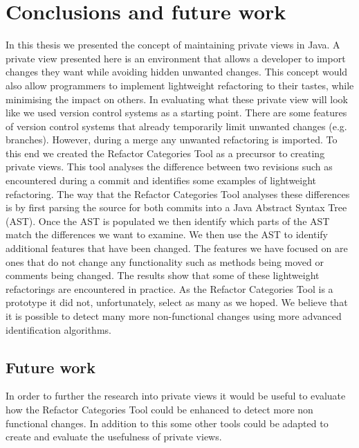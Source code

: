 
\chapter{Conclusions and future work}\label{C:con}

In this thesis we presented the concept of maintaining private views in Java.
A private view presented here is an environment that allows a developer to import changes they want while avoiding hidden unwanted changes. 
This concept would also allow programmers to implement lightweight refactoring to their tastes, while minimising the impact on others.  
In evaluating what these private view will look like we used version control systems as a starting point.
There are some features of version control systems that already temporarily limit unwanted changes (e.g. branches).
However, during a merge any unwanted refactoring is imported. 
To this end we created the Refactor Categories Tool as a precursor to creating private views. 
This tool analyses the difference between two revisions such as encountered during a commit and identifies some examples of lightweight refactoring.
The way that the Refactor Categories Tool analyses these differences is by first parsing the source for both commits into a Java Abstract Syntax Tree (AST).
Once the AST is populated we then identify which parts of the AST match the differences we want to examine.
We then use the AST to identify additional features that have been changed. 
The features we have focused on are ones that do not change any functionality such as methods being moved or comments being changed. 
The results show that some of these lightweight refactorings are encountered in practice.
As the Refactor Categories Tool is a prototype it did not, unfortunately, select as many as we hoped.
We believe that it is possible to detect many more non-functional changes using more advanced identification algorithms.

\section{Future work}

In order to further the research into private views it would be useful to evaluate how the Refactor Categories Tool could be enhanced to detect more non functional changes. 
In addition to this some other tools could be adapted to create and evaluate the usefulness of private views.  
